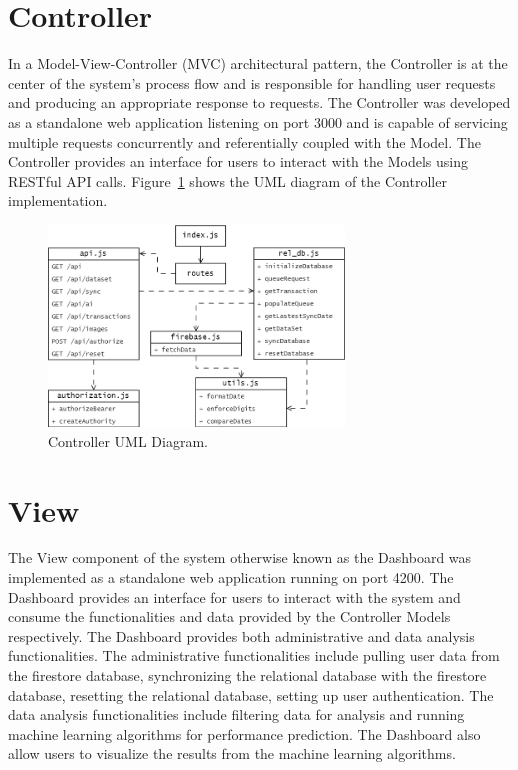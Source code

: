 \section{Controller}
In a Model-View-Controller (MVC) architectural pattern, the Controller is at the center of the system's process flow and is responsible for 
handling user requests and producing an appropriate response to requests. The Controller was developed as a standalone web application
listening on port 3000 and is capable of servicing multiple requests concurrently and referentially coupled with the Model. The Controller
provides an interface for users to interact with the Models using RESTful API calls. Figure~\ref{image:uml_controller} shows the UML diagram of the 
Controller implementation.
\begin{figure}[h!]
    \begin{center}
        \includegraphics[width=0.7\textwidth]{images/uml_controller.png}
        \caption{Controller UML Diagram.}
        \label{image:uml_controller}
    \end{center}
\end{figure}

\section{View}
The View component of the system otherwise known as the Dashboard was implemented as a standalone web application running on port 4200. The 
Dashboard provides an interface for users to interact with the system and consume the functionalities and data provided by the Controller
Models respectively. The Dashboard provides both administrative and data analysis functionalities. The administrative functionalities include
pulling user data from the firestore database, synchronizing the relational database with the firestore database, resetting the relational 
database, setting up user authentication. The data analysis functionalities include filtering data for analysis and running machine learning
algorithms for performance prediction. The Dashboard also allow users to visualize the results from the machine learning algorithms. 

